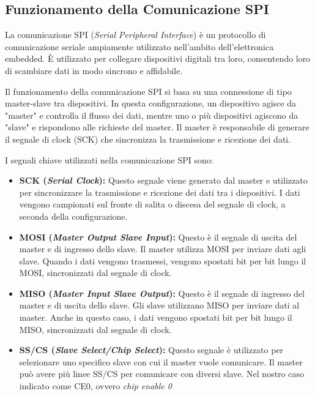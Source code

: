 \documentclass[titlepage]{report}
\begin{document}
		\subsection{Funzionamento della Comunicazione SPI}
		\label{subsec:funzionamento_spi_comm}
			La comunicazione SPI (\textit{Serial Peripheral Interface}) è un protocollo di comunicazione seriale ampiamente utilizzato nell'ambito dell'elettronica embedded. È utilizzato per collegare dispositivi digitali tra loro, consentendo loro di scambiare dati in modo sincrono e affidabile. 

			Il funzionamento della comunicazione SPI si basa su una connessione di tipo master-slave tra dispositivi. In questa configurazione, un dispositivo agisce da "master" e controlla il flusso dei dati, mentre uno o più dispositivi agiscono da "slave" e rispondono alle richieste del master. Il master è responsabile di generare il segnale di clock (SCK) che sincronizza la trasmissione e ricezione dei dati.

			I segnali chiave utilizzati nella comunicazione SPI sono:
			\begin{itemize}
			\item \textbf{SCK (\textit{Serial Clock}):} Questo segnale viene generato dal master e utilizzato per sincronizzare la trasmissione e ricezione dei dati tra i dispositivi. I dati vengono campionati sul fronte di salita o discesa del segnale di clock, a seconda della configurazione.
			
			\item \textbf{MOSI (\textit{Master Output Slave Input}):} Questo è il segnale di uscita del master e di ingresso dello slave. Il master utilizza MOSI per inviare dati agli slave. Quando i dati vengono trasmessi, vengono spostati bit per bit lungo il MOSI, sincronizzati dal segnale di clock.
			
			\item \textbf{MISO (\textit{Master Input Slave Output}):} Questo è il segnale di ingresso del master e di uscita dello slave. Gli slave utilizzano MISO per inviare dati al master. Anche in questo caso, i dati vengono spostati bit per bit lungo il MISO, sincronizzati dal segnale di clock.
			
			\item \textbf{SS/CS (\textit{Slave Select/Chip Select}):} Questo segnale è utilizzato per selezionare uno specifico slave con cui il master vuole comunicare. Il master può avere più linee SS/CS per comunicare con diversi slave. Nel nostro caso indicato come CE0, ovvero \textit{chip enable 0}
			\end{itemize}
\end{document}
